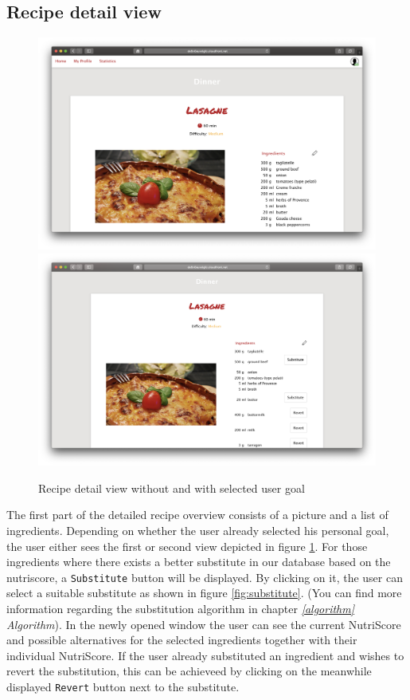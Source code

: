 \subsection*{Recipe detail view}
\vspace{0.5em}
\begin{figure}[H]
	\captionsetup{justification=centering}
	\centering
		\includegraphics[scale=0.25]{Ressourcen/img/screenshots/screenshotH.png}
		\includegraphics[scale=0.25]{Ressourcen/img/screenshots/screenshotI.png}
		\vspace{-1em}
		\caption{Recipe detail view without and with selected user goal}
		\label{fig:recipeDetail}
\end{figure}
\vspace{-2em}
The first part of the detailed recipe overview consists of a picture and a list of ingredients. Depending on whether the user already selected his personal goal, the user either sees the first or second view depicted in figure \ref{fig:recipeDetail}. For those ingredients where there exists a better substitute in our database based on the nutriscore, a \texttt{Substitute} button will be displayed. By clicking on it, the user can select a suitable substitute as shown in figure \ref{fig:substitute}. (You can find more information regarding the substitution algorithm in chapter \emph{\ref{algorithm}  Algorithm}). In the newly opened window the user can see the current NutriScore and possible alternatives for the selected ingredients together with their individual NutriScore. If the user already substituted an ingredient and wishes to revert the substitution, this can be achieveed by clicking on the meanwhile displayed \texttt{Revert} button next to the substitute. 
